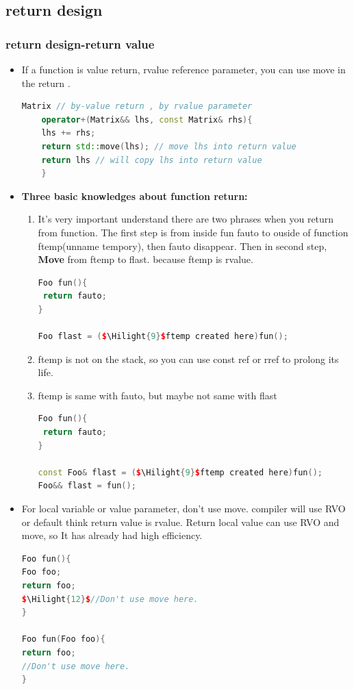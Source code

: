\documentclass[a4paper,12pt,twoside]{book}
\newcommand{\Hilight}[1]{\makebox[0pt][l]{\color{yellow}\rule[-3pt]{#1em}{11pt}}}
\begin{document}
\subsection{return design}
\subsubsection{return design-return value}
\begin{itemize}
	
	
	\item If a function is value return, rvalue reference parameter, you can use move in the return .
	\begin{lstlisting}[frame=single, language=c++]
	Matrix // by-value return , by rvalue parameter
	operator+(Matrix&& lhs, const Matrix& rhs){
	lhs += rhs;
	return std::move(lhs); // move lhs into return value
	return lhs // will copy lhs into return value 
	} 
	\end{lstlisting}
	
	
		\item \textbf{Three basic knowledges about function return:}
				\begin{enumerate}
\item It's very important understand there are two phrases when you return from function. The first step  is from inside fun fauto to ouside of function ftemp(unname tempory), then fauto disappear.  Then in second step, \textbf{Move} from ftemp to flast. because ftemp is rvalue.
\begin{lstlisting}[frame=single, language=c++]
Foo fun(){
 return fauto;
}

Foo flast = ($\Hilight{9}$ftemp created here)fun();
\end{lstlisting}
\item ftemp is not on the stack, so you can use const ref or rref to prolong its life. 
\item ftemp is same with fauto, but maybe not same with flast
\begin{lstlisting}[frame=single, language=c++]
Foo fun(){
 return fauto;
}

const Foo& flast = ($\Hilight{9}$ftemp created here)fun();
Foo&& flast = fun();
\end{lstlisting}
\end{enumerate}

\item For local variable or value parameter, don't use move. compiler will use RVO or default think return value is rvalue.  Return local value can use RVO and move, so It has already had high efficiency.

\begin{lstlisting}[frame=single, language=c++]
Foo fun(){
Foo foo;
return foo;
$\Hilight{12}$//Don't use move here.
}

Foo fun(Foo foo){
return foo;
//Don't use move here.
}
\end{lstlisting}
\end{itemize}
\end{document}
